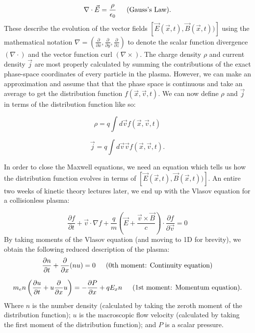 \begin{equation}
\nabla \cdot \vec{E}=\frac{\rho}{\epsilon_{0}} \text{\,\,\,\,\,\,\,\,\,(Gauss's Law)}.
\end{equation} These describe the evolution of the vector fields $[\vec{E}(\vec{x},t),\vec{B}(\vec{x},t))]$ using the mathematical notation $\nabla = \left(\frac{\partial}{\partial x},\frac{\partial}{\partial y},\frac{\partial}{\partial z} \right)$ to denote the scalar function divergence $(\nabla \cdot)$ and the vector function curl $(\nabla \times)$. The charge density $\rho$ and current density $\vec{j}$ are most properly calculated by summing the contributions of the exact phase-space coordinates of every particle in the plasma. However, we can make an approximation and assume that that the phase space is continuous and take an average to get the distribution function $f(\vec{x},\vec{v},t)$. We can now define $\rho$ and $\vec{j}$ in terms of the distribution function like so:

\begin{equation}
\rho= q \int d \vec{v} f(\vec{x},\vec{v},t)
\end{equation}

\begin{equation}
\vec{j} = q \int d \vec{v} \vec{v} f(\vec{x},\vec{v},t).
\end{equation}

In order to close the Maxwell equations, we need an equation which tells us how the distribution function evolves in terms of $[\vec{E}(\vec{x},t),\vec{B}(\vec{x},t))]$. An entire two weeks of kinetic theory lectures later, we end up with the Vlasov equation for a collisionless plasma:

\begin{equation}
 	\frac{\partial f}{\partial t}+\vec{v} \cdot {\nabla} f+\frac{q}{m}\left(\vec{E}+\frac{\vec{v} \times \vec{B}}{c}\right) \cdot \frac{\partial f}{\partial \vec{v}}=0
\end{equation} By taking moments of the Vlasov equation (and moving to 1D for brevity), we obtain the following reduced description of the plasma: 
\begin{equation}
\frac{\partial n}{\partial t}+\frac{\partial}{\partial x}(n u)=0 \text{\,\,\,\,\,\,\,\,\,(0th moment: Continuity equation)}
\end{equation}

\begin{equation}
m_e n \left(\frac{\partial u}{\partial t} + u\frac{\partial}{\partial x}u\right)=-\frac{\partial P}{\partial x}+q E_{x} n \text{\,\,\,\,\,\,\,\,\,(1st moment: Momentum equation)}.
\end{equation} Where $n$ is the number density (calculated by taking the zeroth moment of the distribution function); $u$ is the macroscopic flow velocity (calculated by taking the first moment of the distribution function); and $P$ is a scalar pressure.




